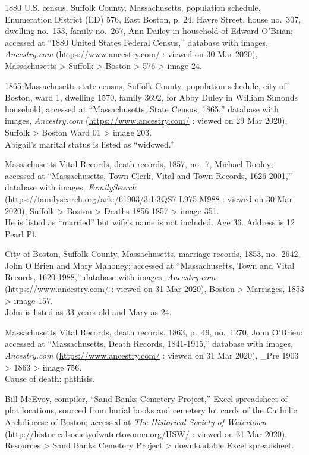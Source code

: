 \begin{thebibliography}{99}
	1880 U.S. census, Suffolk County, Massachusetts, population schedule, Enumeration District (ED) 576, East Boston, p. 24, Havre Street, house no.\ 307, dwelling no.\ 153, family no.\ 267, Ann Dailey in household of Edward O'Brian; accessed at ``1880 United States Federal Census,'' database with images, \textit{Ancestry.com} (\url{https://www.ancestry.com/} : viewed on 30 Mar 2020), Massachusetts > Suffolk > Boston > 576 > image 24.
	
	1865 Massachusetts state census, Suffolk County, population schedule, city of Boston, ward 1, dwelling 1570, family 3692, for Abby Duley in William Simonds household; accessed at ``Massachusetts, State Census, 1865,'' database with images, \textit{Ancestry.com} (\url{https://www.ancestry.com/} : viewed on 29 Mar 2020), Suffolk > Boston Ward 01 > image 203.\\
	Abigail's marital status is listed as ``widowed.''
	
	Massachusetts Vital Records, death records, 1857, no.\ 7, Michael Dooley; accessed at ``Massachusetts, Town Clerk, Vital and Town Records, 1626-2001,'' database with images, \textit{FamilySearch} (\url{https://familysearch.org/ark:/61903/3:1:3QS7-L975-M988} : viewed on 30 Mar 2020), Suffolk > Boston > Deaths 1856-1857 > image 351.\\
	He is listed as ``married'' but wife's name is not included. Age 36. Address is 12 Pearl Pl.
	
	City of Boston, Suffolk County, Massachusetts, marriage records, 1853, no.\ 2642, John O'Brien and Mary Mahoney; accessed at ``Massachusetts, Town and Vital Records, 1620-1988,'' database with images, \textit{Ancestry.com} (\url{https://www.ancestry.com/} : viewed on 31 Mar 2020), Boston > Marriages, 1853 > image 157.\\
	John is listed as 33 years old and Mary as 24.
	
	Massachusetts Vital Records, death records, 1863, p.\ 49, no.\ 1270, John O'Brien; accessed at ``Massachusetts, Death Records, 1841-1915,'' database with images, \textit{Ancestry.com} (\url{https://www.ancestry.com/} : viewed on 31 Mar 2020), \_Pre 1903 > 1863 > image 756.\\
	Cause of death: phthisis.
	
	Bill McEvoy, compiler, ``Sand Banks Cemetery Project,'' Excel spreadsheet of plot locations, sourced from burial books and cemetery lot cards of the Catholic Archdiocese of Boston; accessed at \textit{The Historical Society of Watertown} (\url{http://historicalsocietyofwatertownma.org/HSW/} : viewed on 31 Mar 2020), Resources > Sand Banks Cemetery Project > downloadable Excel spreadsheet.
	

\end{thebibliography}
